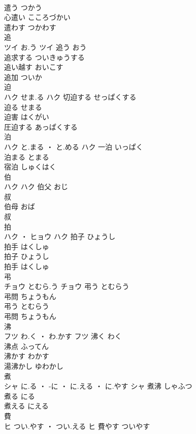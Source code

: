 \documentclass[8pt]{extreport}
\begin{document}
\begin{CJK}{UTF8}{min}
\\	遣う	つかう	
\\	心遣い	こころづかい	
\\	遣わす	つかわす	
\\	追	
\\	ツイ	お.う	ツイ	追う	おう	
\\	追求する	ついきゅうする	
\\	追い越す	おいこす	
\\	追加	ついか	
\\	迫	
\\	ハク	せま.る	ハク	切迫する	せっぱくする	
\\	迫る	せまる	
\\	迫害	はくがい	
\\	圧迫する	あっぱくする	
\\	泊	
\\	ハク	と.まる ・ と.める	ハク	一泊	いっぱく	
\\	泊まる	とまる	
\\	宿泊	しゅくはく	
\\	伯	
\\	ハク		ハク	伯父	おじ	
\\	叔 
\\	伯母	おば	
\\	叔 
\\	拍	
\\	ハク ・ ヒョウ		ハク	拍子	ひょうし	
\\	拍手	はくしゅ	
\\	拍子	ひょうし	
\\	拍手	はくしゅ	
\\	弔	
\\	チョウ	とむら.う	チョウ	弔う	とむらう	
\\	弔問	ちょうもん	
\\	弔う	とむらう	
\\	弔問	ちょうもん	
\\	沸	
\\	フツ	わ.く ・ わ.かす	フツ	沸く	わく	
\\	沸点	ふってん	
\\	沸かす	わかす	
\\	湯沸かし	ゆわかし	
\\	煮	
\\	シャ	に.る ・ -に ・ に.える ・ に.やす	シャ	煮沸	しゃふつ	
\\	煮る	にる	
\\	煮える	にえる	
\\	費	
\\	ヒ	つい.やす ・ つい.える	ヒ	費やす	ついやす	

\end{CJK}
\end{document}
